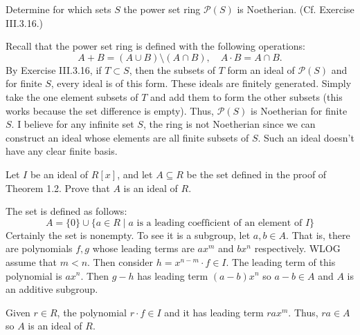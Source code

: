 \documentclass[../../master.tex]{subfiles}
\begin{document}
    \begin{problem}
        Determine for which sets $S$ the power set ring $\mathscr{P}(S)$ is
        Noetherian. (Cf. Exercise III.3.16.)
    \end{problem}

    \begin{solution}
        Recall that the power set ring is defined with the following operations:
        \[
            A + B = (A \cup B) \setminus (A \cap B), \quad A \cdot B = A \cap B.
        \] 
        By Exercise III.3.16, if $T \subset S$, then the subsets of $T$ form an
        ideal of $\mathscr{P}(S)$ and for finite $S$, every ideal is of this
        form. These ideals are finitely generated. Simply take the one element
        subsets of $T$ and add them to form the other subsets (this works
        because the set difference is empty). Thus, $\mathscr{P}(S)$ is
        Noetherian for finite $S$. I believe for any infinite set $S$, the ring
        is not Noetherian since we can construct an ideal whose elements are all
        finite subsets of $S$. Such an ideal doesn't have any clear finite basis.
    \end{solution}
    
    \begin{problem}
        Let $I$ be an ideal of $R[x]$, and let $A \subseteq R$ be the set
        defined in the proof of Theorem 1.2. Prove that $A$ is an ideal of $R$.
    \end{problem}

    \begin{solution}
        The set is defined as follows:
        \[
            A = \{0\} \cup \{a \in R \mid a \text{ is a leading coefficient of
            an element of $I$}\}
        \] 
        Certainly the set is nonempty. To see it is a subgroup, let $a, b \in
        A$. That is, there are polynomials $f, g$ whose leading terms are $a
        x^{m}$ and $b x^{n}$ respectively. WLOG assume that $m < n$. Then
        consider $h = x^{n - m} \cdot f \in I$. The leading term of this polynomial
        is $a x^{n}$. Then $g - h$ has leading term $(a - b) x^{n}$ so $a - b
        \in A$ and $A$ is an additive subgroup.

        Given $r \in R$, the polynomial $r \cdot f \in I$ and it has leading
        term $ra x^{m}$. Thus, $ra \in A$ so $A$ is an ideal of $R$.
    \end{solution}
\end{document}
